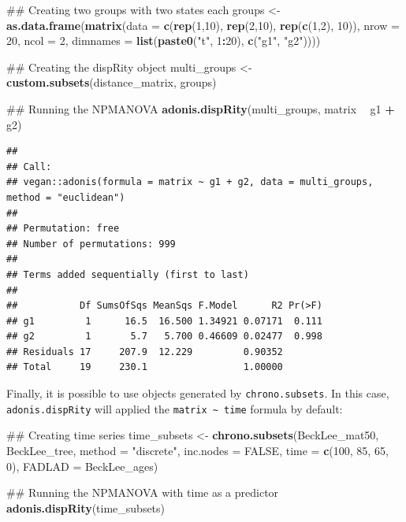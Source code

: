 \documentclass[]{book}
\newenvironment{Shaded}{\begin{snugshade}}{\end{snugshade}}
\newcommand{\KeywordTok}[1]{\textcolor[rgb]{0.13,0.29,0.53}{\textbf{#1}}}
\newcommand{\DataTypeTok}[1]{\textcolor[rgb]{0.13,0.29,0.53}{#1}}
\newcommand{\DecValTok}[1]{\textcolor[rgb]{0.00,0.00,0.81}{#1}}
\newcommand{\StringTok}[1]{\textcolor[rgb]{0.31,0.60,0.02}{#1}}
\newcommand{\OtherTok}[1]{\textcolor[rgb]{0.56,0.35,0.01}{#1}}
\newcommand{\OperatorTok}[1]{\textcolor[rgb]{0.81,0.36,0.00}{\textbf{#1}}}
\newcommand{\NormalTok}[1]{#1}
\theoremstyle{definition}
\theoremstyle{definition}
\theoremstyle{remark}
\begin{document}
\begin{Shaded}
\begin{Highlighting}[]
\NormalTok{## Creating two groups with two states each}
\NormalTok{groups <-}\StringTok{ }\KeywordTok{as.data.frame}\NormalTok{(}\KeywordTok{matrix}\NormalTok{(}\DataTypeTok{data =} \KeywordTok{c}\NormalTok{(}\KeywordTok{rep}\NormalTok{(}\DecValTok{1}\NormalTok{,}\DecValTok{10}\NormalTok{), }\KeywordTok{rep}\NormalTok{(}\DecValTok{2}\NormalTok{,}\DecValTok{10}\NormalTok{), }\KeywordTok{rep}\NormalTok{(}\KeywordTok{c}\NormalTok{(}\DecValTok{1}\NormalTok{,}\DecValTok{2}\NormalTok{), }\DecValTok{10}\NormalTok{)),}
         \DataTypeTok{nrow =} \DecValTok{20}\NormalTok{, }\DataTypeTok{ncol =} \DecValTok{2}\NormalTok{, }\DataTypeTok{dimnames =} \KeywordTok{list}\NormalTok{(}\KeywordTok{paste0}\NormalTok{(}\StringTok{"t"}\NormalTok{, }\DecValTok{1}\OperatorTok{:}\DecValTok{20}\NormalTok{), }\KeywordTok{c}\NormalTok{(}\StringTok{"g1"}\NormalTok{, }\StringTok{"g2"}\NormalTok{))))}

\NormalTok{## Creating the dispRity object}
\NormalTok{multi_groups <-}\StringTok{ }\KeywordTok{custom.subsets}\NormalTok{(distance_matrix, groups)}

\NormalTok{## Running the NPMANOVA}
\KeywordTok{adonis.dispRity}\NormalTok{(multi_groups, matrix }\OperatorTok{~}\StringTok{ }\NormalTok{g1 }\OperatorTok{+}\StringTok{ }\NormalTok{g2)}
\end{Highlighting}
\end{Shaded}

\begin{verbatim}
## 
## Call:
## vegan::adonis(formula = matrix ~ g1 + g2, data = multi_groups,      method = "euclidean") 
## 
## Permutation: free
## Number of permutations: 999
## 
## Terms added sequentially (first to last)
## 
##           Df SumsOfSqs MeanSqs F.Model      R2 Pr(>F)
## g1         1      16.5  16.500 1.34921 0.07171  0.111
## g2         1       5.7   5.700 0.46609 0.02477  0.998
## Residuals 17     207.9  12.229         0.90352       
## Total     19     230.1                 1.00000
\end{verbatim}

Finally, it is possible to use objects generated by
\texttt{chrono.subsets}. In this case, \texttt{adonis.dispRity} will
applied the \texttt{matrix\ \textasciitilde{}\ time} formula by default:

\begin{Shaded}
\begin{Highlighting}[]
\NormalTok{## Creating time series}
\NormalTok{time_subsets <-}\StringTok{ }\KeywordTok{chrono.subsets}\NormalTok{(BeckLee_mat50, BeckLee_tree, }
     \DataTypeTok{method =} \StringTok{"discrete"}\NormalTok{, }\DataTypeTok{inc.nodes =} \OtherTok{FALSE}\NormalTok{, }\DataTypeTok{time =} \KeywordTok{c}\NormalTok{(}\DecValTok{100}\NormalTok{, }\DecValTok{85}\NormalTok{, }\DecValTok{65}\NormalTok{, }\DecValTok{0}\NormalTok{),}
     \DataTypeTok{FADLAD =}\NormalTok{ BeckLee_ages)}

\NormalTok{## Running the NPMANOVA with time as a predictor}
\KeywordTok{adonis.dispRity}\NormalTok{(time_subsets)}
\end{Highlighting}
\end{Shaded}
\end{document}
